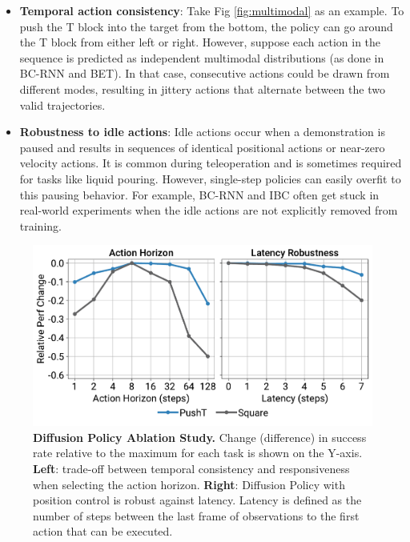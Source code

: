 \documentclass[Afour,sageh,times]{sagej}
\begin{document}
\begin{itemize} [leftmargin=3mm]
    \item \textbf{Temporal action consistency}: Take Fig \ref{fig:multimodal} as an example. To push the T block into the target from the bottom, the policy can go around the T block from either left or right. However, suppose each action in the sequence is predicted as independent multimodal distributions (as done in BC-RNN and BET). In that case, consecutive actions could be drawn from different modes, resulting in jittery actions that alternate between the two valid trajectories.

    \item \textbf{Robustness to idle actions}: Idle actions occur when a demonstration is paused and results in sequences of identical positional actions or near-zero velocity actions. It is common during teleoperation and is sometimes required for tasks like liquid pouring. However, single-step policies can easily overfit to this pausing behavior. For example, BC-RNN and IBC often get stuck in real-world experiments when the idle actions are not explicitly removed from training.

\end{itemize}

\begin{figure}[h]
\centering
\includegraphics[width=\linewidth]{figure/ablation_figure.pdf}
\vspace{-6mm}

\caption{\textbf{Diffusion Policy Ablation Study.}
Change (difference) in success rate relative to the maximum for each task is shown on the Y-axis.
\textbf{Left}: trade-off between temporal consistency and responsiveness when selecting the action horizon.
\textbf{Right}: Diffusion Policy with position control is robust against latency.
Latency is defined as the number of steps between the last frame of observations to the first action that can be executed.
}
\label{fig:ablation}
\vspace{-5mm}
\end{figure}
\end{document}
